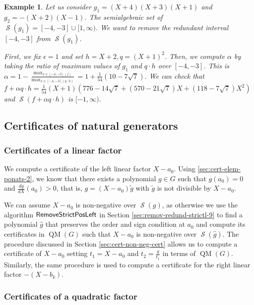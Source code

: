 \documentclass[preprint,12pt,authoryear]{elsarticle}
\newtheorem{example}[theorem]{Example}
\newenvironment{example1}
  {\begin{example}\rm}
  {\end{example}}
\DeclareMathOperator{\quadmod}{QM}
\DeclareMathOperator{\semialgebraic}{\mathcal{S}}
\DeclareMathOperator{\algRemoveStrictPosLeft}{\sf RemoveStrictPosLeft}
\begin{document}
\begin{example1}
  \th\label{sec:remov-redund-strictl-11} Let us consider $g_1 = (X+4)(X+3)(X+1)$
  and $g_2 = -(X + 2)(X - 1)$. The semialgebraic set of
  $\semialgebraic(g_1) = [-4, -3] \cup [1, \infty)$. We want to remove the
  redundant interval $[-4, -3]$ from $\semialgebraic(g_1)$.

  First, we fix $\epsilon = 1$ and set $h = X + 2, q = (X + 1)^{2}$. Then, we
  compute $\alpha$ by taking the ratio of maximum values of $g_1$ and
  $q \cdot h$ over $[-4, -3]$. This is
  $\alpha = 1 - \frac{\max_{x \in [-4, -3](f)}}{\max_{x \in [-4, -3](q \cdot
      h)}} = 1 + \frac{1}{54}(10 - 7 \sqrt{7})$. We can check that
  $f + \alpha q \cdot h = \frac{1}{54} (X + 1) (776 - 14 \sqrt{7} + (570 - 21
  \sqrt{7})X + (118 - 7 \sqrt{7})X^2)$ and
  $\semialgebraic(f + \alpha q \cdot h)$ is $[-1, \infty)$.
\end{example1}

 \subsection{Certificates of natural generators}
\label{sec:cert-natur-gener-1982}

\subsubsection{Certificates of a linear factor}
\label{sec:cert-line-fact}

We compute a certificate of the left linear factor $X - a_0$. Using
\th\ref{sec:cert-elem-ponats-2}, we know that there exists a polynomial
$g \in G$ such that $g(a_0) = 0$ and $\frac{d g}{dX}(a_0) > 0$, that is,
$g = (X - a_0) \tilde{g}$ with $\tilde{g}$ is not divisible by $X -
a_0$.

We can assume $X - a_0$ is non-negative over $\semialgebraic(g)$, as otherwise
we use the algorithm $\algRemoveStrictPosLeft$ in Section
\ref{sec:remov-redund-strictl-9} to find a polynomial $\hat{g}$ that preserves
the order and sign condition at $a_0$ and compute its certificates in
$\quadmod(G)$ such that $X - a_0$ is non-negative over
$\semialgebraic(\hat{g})$. The procedure discussed in Section
\ref{sec:cert-non-neg-cert} allows us to compute a certificate of $X - a_0$
setting $t_{1} = X - a_0$ and $t_{2} = \frac{g}{t_{1}}$ in terms of
$\quadmod(G)$. Similarly, the same procedure is used to compute a certificate
for the right linear factor $-(X - b_k)$.

 \subsubsection{Certificates of a quadratic factor}
\end{document}
